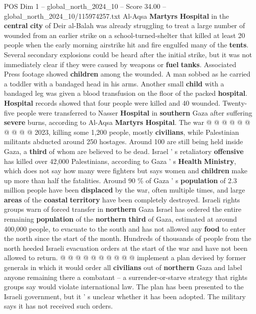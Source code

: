 \begin{textsample}{POS Dim 1 – global\_north\_2024\_10 – Score 34.00 – global\_north\_2024\_10/115974257.txt}
Al-Aqsa \textbf{Martyrs} \textbf{Hospital} in the \textbf{central} \textbf{city} of Deir al-Balah was already struggling to treat a large number of wounded from an earlier strike on a school-turned-shelter that killed at least 20 people when the early morning airstrike hit and fire engulfed many of the \textbf{tents}.
Several secondary explosions could be heard after the initial strike, but it was not immediately clear if they were caused by weapons or \textbf{fuel} \textbf{tanks}.
Associated Press footage showed \textbf{children} among the wounded.
A man sobbed as he carried a toddler with a bandaged head in his arms.
Another small \textbf{child} with a bandaged leg was given a blood transfusion on the floor of the packed \textbf{hospital}. \textbf{Hospital} records showed that four people were killed and 40 wounded.
Twenty-five people were transferred to Nasser \textbf{Hospital} in \textbf{southern} Gaza after suffering \textbf{severe} burns, according to Al-Aqsa \textbf{Martyrs} \textbf{Hospital}.
The war @ @ @ @ @ @ @ @ @ @ 2023, killing some 1,200 people, mostly \textbf{civilians}, while Palestinian militants abducted around 250 hostages.
Around 100 are still being held inside Gaza, a \textbf{third} of whom are believed to be dead.
Israel ' s retaliatory \textbf{offensive} has killed over 42,000 Palestinians, according to Gaza ' s \textbf{Health} \textbf{Ministry}, which does not say how many were fighters but says women and \textbf{children} make up more than half the fatalities.
Around 90 \% of Gaza ' s \textbf{population} of 2.3 million people have been \textbf{displaced} by the war, often multiple times, and large \textbf{areas} of the \textbf{coastal} \textbf{territory} have been completely destroyed.
Israeli rights groups warn of forced transfer in \textbf{northern} Gaza Israel has ordered the entire remaining \textbf{population} of the \textbf{northern} \textbf{third} of Gaza, estimated at around 400,000 people, to evacuate to the south and has not allowed any \textbf{food} to enter the north since the start of the month.
Hundreds of thousands of people from the north heeded Israeli evacuation orders at the start of the war and have not been allowed to return. @ @ @ @ @ @ @ @ @ @ implement a plan devised by former generals in which it would order all \textbf{civilians} out of \textbf{northern} Gaza and label anyone remaining there a combatant -- a surrender-or-starve strategy that rights groups say would violate international law.
The plan has been presented to the Israeli government, but it ' s unclear whether it has been adopted.
The military says it has not received such orders.

\end{textsample}
